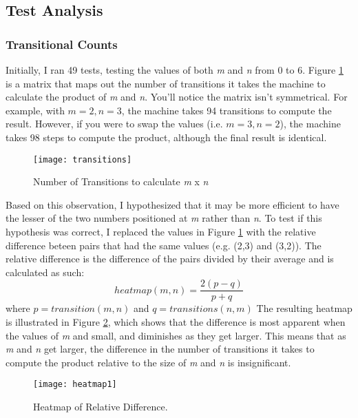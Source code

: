\documentclass[a4paper,12pt]{article}
\begin{document}
\subsection{Test Analysis}
\subsubsection{Transitional Counts}
Initially, I ran 49 tests, testing the values of both \textit{m} and \textit{n} from 0 to 6. Figure \ref{fig:transitions} is a matrix that maps out the number of transitions it takes the machine to calculate the product of \textit{m} and \textit{n}. You'll notice the matrix isn't symmetrical. For example, with $m=2, n=3$, the machine takes 94 transitions to compute the result. However, if you were to swap the values (i.e. $m=3, n=2$), the machine takes 98 steps to compute the product, although the final result is identical.


\begin{figure}[H]
	\centering
	\texttt{[image: transitions]}
	\caption{Number of Transitions to calculate \textit{m} x \textit{n}}
	\label{fig:transitions}
\end{figure}

Based on this observation, I hypothesized that it may be more efficient to have the lesser of the two numbers positioned at \textit{m} rather than \textit{n}. To test if this hypothesis was correct, I replaced the values in Figure \ref{fig:transitions} with the relative difference beteen pairs that had the same values (e.g. (2,3) and (3,2)). 
The relative difference is the difference of the pairs divided by their average and is calculated as such:
\begin{equation}
heatmap(m,n) = \frac{2(p-q)}{p+q}
\end{equation}
where $p = transition(m,n)$ and $q = transitions(n,m)$\newline
The resulting heatmap is illustrated in Figure \ref{fig:heatmap}, which shows that the difference is most apparent when the values of \textit{m} and small, and diminishes as they get larger. This means that as \textit{m} and \textit{n} get larger, the difference in the number of transitions it takes to compute the product relative to the size of \textit{m} and \textit{n} is insignificant.
\begin{figure}[H]
	\texttt{[image: heatmap1]}
	\caption{Heatmap of Relative Difference.}
	\label{fig:heatmap}
\end{figure}
\end{document}
